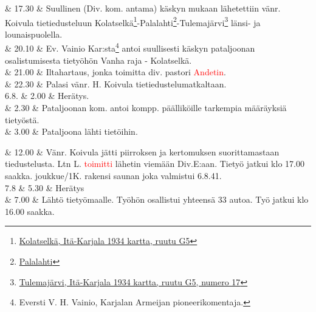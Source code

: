 \documentclass[11pt,a5paper,oneside]{book}
\begin{document}

& 17.30 & Suullinen (Div. kom. antama) käskyn mukaan lähetettiin vänr. Koivula tietiedusteluun Kolatselkä\footnote{\href{https://www.google.fi/maps/place/Kolatsel'ga,+Republic+of+Karelia,+Russia,+186148/}{Kolatselkä, Itä-Karjala 1934 kartta, ruutu G5}}-Palalahti\footnote{\href{https://www.google.fi/maps/place/Palalakhta,+Republic+of+Karelia,+Russia,+186148/}{Palalahti}}-Tulemajärvi\footnote{\href{https://www.google.fi/maps/place/Ozero+Tulmozero/}{Tulemajärvi, Itä-Karjala 1934 kartta, ruutu G5, numero 17}} länsi- ja lounaispuolella. \newline \\

& 20.10 & Ev. Vainio Kar:sta\footnote{Eversti V. H. Vainio, Karjalan Armeijan pioneerikomentaja.} antoi suullisesti käskyn pataljoonan osalistumisesta tietyöhön Vanha raja - Kolatselkä. \\

& 21.00 & Iltahartaus, jonka toimitta div. pastori \textcolor{red}{Andetin}. \\

& 22.30 & Palasi vänr. H. Koivula tietiedustelumatkaltaan. \newline\newline\newline\newline\newline \\

6.8. & 2.00 & Herätys. \\

& 2.30 & Pataljoonan kom. antoi kompp. päälliköille tarkempia määräyksiä tietyöstä. \\

& 3.00 & Pataljoona lähti tietöihin. \\
\newpage

& 12.00 & Vänr. Koivula jätti piirroksen ja kertomuksen suorittamastaan tiedustelusta. Ltn L. \textcolor{red}{toimitti} lähetin viemään Div.E:aan. Tietyö jatkui klo 17.00 saakka.  joukkue/1K. rakensi saunan joka valmistui 6.8.41. \newline\newline \\

7.8 & 5.30 & Herätys \\

& 7.00 & Lähtö tietyömaalle. Työhön osallistui yhteensä 33 autoa. \newline Työ jatkui klo 16.00 saakka. \\
\end{document}
